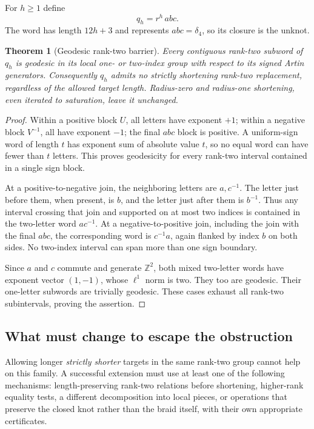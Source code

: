 \documentclass[11pt]{article}
\newtheorem{theorem}{Theorem}[section]
\theoremstyle{definition}
\theoremstyle{remark}
\newcommand{\Z}{\mathbb Z}
\begin{document}
For $h\ge1$ define
\begin{equation}\label{eq:barrierfamily}
 q_h=r^h\,abc.
\end{equation}
The word has length $12h+3$ and represents $abc=\delta_4$, so its closure is
the unknot.

\begin{theorem}[Geodesic rank-two barrier]\label{thm:barrier}
Every contiguous rank-two subword of $q_h$ is geodesic in its local
one- or two-index group with respect to its signed Artin generators.
Consequently $q_h$ admits no strictly shortening rank-two replacement,
regardless of the allowed target length. Radius-zero and radius-one
shortening, even iterated to saturation, leave it unchanged.
\end{theorem}
\begin{proof}
Within a positive block $U$, all letters have exponent $+1$; within a
negative block $V^{-1}$, all have exponent $-1$; the final $abc$ block is
positive. A uniform-sign word of length $t$ has exponent sum of absolute
value $t$, so no equal word can have fewer than $t$ letters. This proves
geodesicity for every rank-two interval contained in a single sign block.

At a positive-to-negative join, the neighboring letters are $a,c^{-1}$.
The letter just before them, when present, is $b$, and the letter just
after them is $b^{-1}$. Thus any interval crossing that join and supported
on at most two indices is contained in the two-letter word $ac^{-1}$.
At a negative-to-positive join, including the join with the final $abc$,
the corresponding word is $c^{-1}a$, again flanked by index $b$ on both
sides. No two-index interval can span more than one sign boundary.

Since $a$ and $c$ commute and generate $\Z^2$, both mixed two-letter words
have exponent vector $(1,-1)$, whose $\ell^1$ norm is two. They too are
geodesic. Their one-letter subwords are trivially geodesic. These cases
exhaust all rank-two subintervals, proving the assertion.
\end{proof}

\subsection{What must change to escape the obstruction}
Allowing longer \emph{strictly shorter} targets in the same rank-two group
cannot help on this family. A successful extension must use at least one
of the following mechanisms: length-preserving rank-two relations before
shortening, higher-rank equality tests, a different decomposition into local
pieces, or operations that preserve the closed knot rather than the braid
itself, with their own appropriate certificates.
\end{document}
